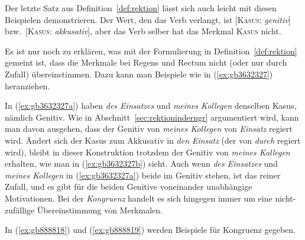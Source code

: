 Der letzte Satz aus Definition~\ref{def:rektion} lässt sich auch leicht mit diesen Beispielen demonstrieren.
Der Wert, den das Verb verlangt, ist [\textsc{Kasus}: \textit{genitiv}] bzw.\ [\textsc{Kasus}: \textit{akkusativ}], aber das Verb selber hat das Merkmal \textsc{Kasus} nicht.

Es ist nur noch zu erklären, was mit der Formulierung in Definition~\ref{def:rektion} gemeint ist, dass die Merkmale bei Regens und Rectum nicht (oder nur durch Zufall) übereinstimmen.
Dazu kann man Beispiele wie in (\ref{ex:gb3632327}) heranziehen.

\begin{exe}
  \ex\label{ex:gb3632327} 
  \begin{xlist}
  \end{xlist}
\end{exe}

In (\ref{ex:gb3632327a}) haben \textit{des Einsatzes} und \textit{meines Kollegen} denselben Kasus, nämlich Genitiv.
Wie in Abschnitt~\ref{sec:rektioninderngr} argumentiert wird, kann man davon ausgehen, dass der Genitiv von \textit{meines Kollegen} von \textit{Einsatz} regiert wird.
Ändert sich der Kasus zum Akkusativ in \textit{den Einsatz} (der von \textit{durch} regiert wird), bleibt in dieser Konstruktion trotzdem der Genitiv von \textit{meines Kollegen} erhalten, wie man in (\ref{ex:gb3632327b}) sieht.
Auch wenn \textit{des Einsatzes} und \textit{meines Kollegen} in (\ref{ex:gb3632327a}) beide im Genitiv stehen, ist das reiner Zufall, und es gibt für die beiden Genitive voneinander unabhängige Motivationen.
Bei der \textit{Kongruenz} handelt es sich hingegen immer um eine nicht-zufällige Übereinstimmung von Merkmalen.

\Stretch[0.5]


\Stretch[0.5]

In (\ref{ex:gb888818}) und (\ref{ex:gb888819}) werden Beispiele für Kongruenz gegeben.

\begin{exe}
\end{exe}

